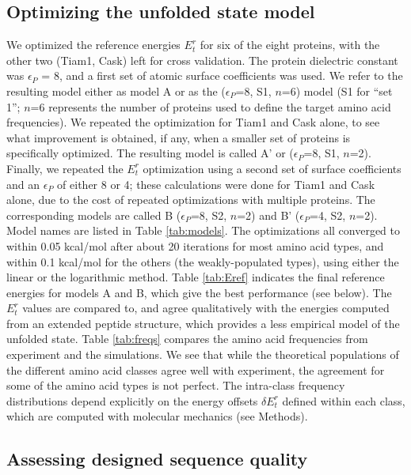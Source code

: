 \documentclass[12pt]{article}
\begin{document}
\subsection{Optimizing the unfolded state model}
We optimized the reference energies $E^r_t$ for six of the eight proteins, with the other two (Tiam1, Cask) left for cross
validation. The protein dielectric constant was $\epsilon_P$ = 8, and a first set of atomic surface coefficients was used.
We refer to the resulting model either as model A or as the ($\epsilon_P$=8, S1, $n$=6) model (S1 for ``set 1''; $n$=6
represents the number of proteins used to define the target amino acid frequencies). We repeated the optimization for Tiam1
and Cask alone, to see what improvement is obtained, if any, when a smaller set of proteins is specifically optimized.
The resulting model is called A' or ($\epsilon_P$=8, S1, $n$=2). Finally, we repeated the $E^r_t$ optimization using a
second set of surface coefficients and an $\epsilon_P$ of either 8 or 4; these calculations were done for Tiam1 and Cask
alone, due to the cost of repeated optimizations with multiple proteins. The corresponding models are called B ($\epsilon_P$=8,
S2, $n$=2) and B' ($\epsilon_P$=4, S2, $n$=2). Model names are listed in Table \ref{tab:models}. The optimizations all
converged to within 0.05 kcal/mol after about 20 iterations for most amino acid types, and within 0.1 kcal/mol for the
others (the weakly-populated types), using either the linear or the logarithmic method. Table \ref{tab:Eref} indicates
the final reference energies for models A and B, which give the best performance (see below). The $E^r_t$ values are compared
to, and agree qualitatively with the energies computed from an extended peptide structure, which provides a less empirical
model of the unfolded state. Table \ref{tab:freqs} compares the amino acid frequencies from experiment and the simulations.
We see that while the theoretical populations of the different amino acid classes agree well with experiment, the agreement
for some of the amino acid types is not perfect. The intra-class frequency distributions depend explicitly on the energy offsets
$\delta E^r_t$ defined within each class, which are computed with molecular mechanics (see Methods).

\subsection{Assessing designed sequence quality}
\end{document}
